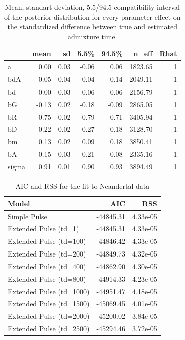 \documentclass[11pt]{article}
\begin{document}
\begin{table}[H]

\caption{\label{tab:tableS1_2}\label{tab:tableS1} Mean, standart deviation, 5.5/94.5 compatibility interval of the posterior distribution for every parameter effect on the standardized difference between true and estimated admixture time.}
\centering
\begin{tabular}[t]{l|r|r|r|r|r|r}
\hline
  & mean & sd & 5.5\% & 94.5\% & n\_eff & Rhat\\
\hline
a & 0.00 & 0.03 & -0.06 & 0.06 & 1823.65 & 1\\
\cline{1-7}
bdA & 0.05 & 0.04 & -0.04 & 0.14 & 2049.11 & 1\\
\cline{1-7}
bd & 0.00 & 0.03 & -0.06 & 0.06 & 2156.79 & 1\\
\cline{1-7}
bG & -0.13 & 0.02 & -0.18 & -0.09 & 2865.05 & 1\\
\cline{1-7}
bR & -0.75 & 0.02 & -0.79 & -0.71 & 3405.94 & 1\\
\cline{1-7}
bD & -0.22 & 0.02 & -0.27 & -0.18 & 3128.70 & 1\\
\cline{1-7}
bm & 0.13 & 0.02 & 0.09 & 0.18 & 3850.41 & 1\\
\cline{1-7}
bA & -0.15 & 0.03 & -0.21 & -0.08 & 2335.16 & 1\\
\cline{1-7}
sigma & 0.91 & 0.01 & 0.90 & 0.93 & 3894.49 & 1\\
\hline
\end{tabular}
\end{table}

\begin{table}[H]

\caption{\label{tab:tableS2_2}\label{tab:tableS2} AIC and RSS for the fit to Neandertal data}
\centering
\begin{tabular}[t]{l|r|r}
\hline
Model & AIC & RSS\\
\hline
Simple Pulse & -44845.31 & 4.33e-05\\
\hline
Extended Pulse (td=1) & -44845.31 & 4.33e-05\\
\hline
Extended Pulse (td=100) & -44846.42 & 4.33e-05\\
\hline
Extended Pulse (td=200) & -44849.73 & 4.32e-05\\
\hline
Extended Pulse (td=400) & -44862.90 & 4.30e-05\\
\hline
Extended Pulse (td=800) & -44914.33 & 4.23e-05\\
\hline
Extended Pulse (td=1000) & -44951.47 & 4.18e-05\\
\hline
Extended Pulse (td=1500) & -45069.45 & 4.01e-05\\
\hline
Extended Pulse (td=2000) & -45200.02 & 3.84e-05\\
\hline
Extended Pulse (td=2500) & -45294.46 & 3.72e-05\\
\hline
\end{tabular}
\end{table}
\end{document}
